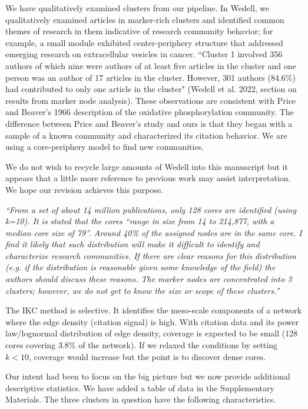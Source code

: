 \documentclass[11pt, oneside]{article}   	%
\begin{document}
We have qualitatively examined clusters from our pipeline. In Wedell, we qualitatively examined articles in marker-rich clusters and identified common themes of research in them indicative of research community behavior; for example, a small module exhibited center-periphery structure that addressed emerging research on extracellular vesicles in cancer. ``Cluster 1 involved 356 authors of which nine were authors of at least five articles in the cluster and one person was an author of 17 articles in the cluster. However, 301 authors (84.6\%) had contributed to only one article in the cluster" (Wedell et al. 2022, section on results from marker node analysis). These observations are consistent with Price and Beaver's 1966 description of the oxidative phosphorylation community. The difference between Price and Beaver's study and ours is that they began with a sample of a known community and characterized its citation behavior. We are using a core-periphery model to find new communities.

We do not wish to recycle large amounts of Wedell into this manuscript but it appears that a little more reference to previous work may assist interpretation. We hope our revision achieves this purpose. 

\emph{``From a set of about 14 million publications, only 128 cores are identified (using k=10). It is stated that the cores “range in size from 14 to 214,877, with a median core size of 79”. Around 40\% of the assigned nodes are in the same core. I find it likely that such distribution will make it difficult to identify and characterize research communities. If there are clear reasons for this distribution (e.g. if the distribution is reasonable given some knowledge of the field) the authors should discuss these reasons. The marker nodes are concentrated into 3 clusters; however, we do not get to know the size or scope of these clusters.''}

The IKC method is selective. It identifies the meso-scale components of a network where the edge density (citation signal) is high. With citation data and its power law/lognormal distribution of edge density, coverage is expected to be small (128 cores covering 3.8\% of the network). If we relaxed the conditions by setting $k<10$, coverage would increase but the point is to discover dense cores.

Our intent had been to focus on the big picture but we now provide additional descriptive statistics. We have added a table of data in the Supplementary Materials. The three clusters in question have the following characteristics. 
\end{document}
